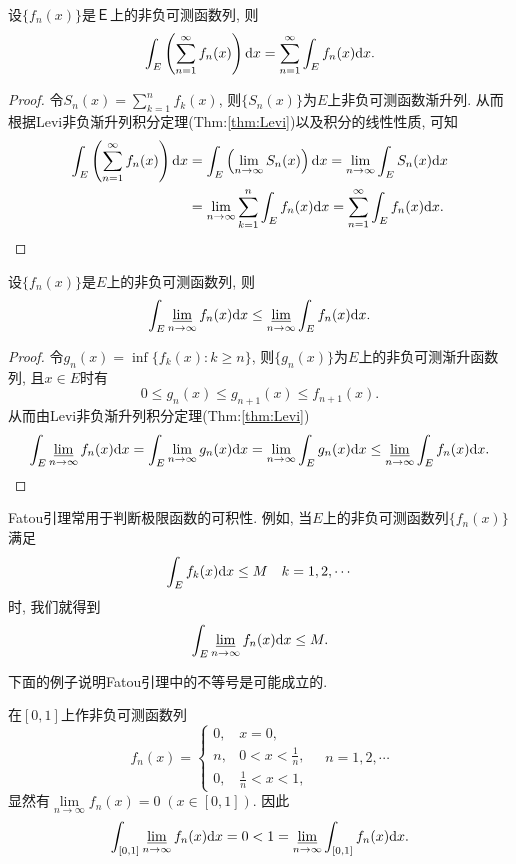 \vskip 0.2cm
\begin{theorem}[逐项积分定理]
\label{thm:Progressive Integral}
	设$\{ f_n (x) \}$是Ｅ上的非负可测函数列, 则
	\begin{equation}
		\int_E \left( \sum\limits_{n = 1}^{\infty} f_n(x) \right) \mathrm{d} x
		= \sum\limits_{n = 1}^{\infty} \int_E f_n(x) \mathrm{d} x.
	\end{equation}
\end{theorem}
\begin{proof}
	令$S_n (x) = \sum\limits_{k = 1}^{n} f_k(x)$, 
	则$\{ S_n(x) \}$为$E$上非负可测函数渐升列. 
	从而根据Levi非负渐升列积分定理(Thm:\ref{thm:Levi})以及积分的线性性质, 可知
	$$
	\begin{aligned}
		\int_E \left( \sum\limits_{n = 1}^{\infty} f_n(x) \right) \mathrm{d} x
		& = \int_E \left(\lim\limits_{n \to \infty} S_n(x)  \right) \mathrm{d} x 
		 = \lim\limits_{n \to \infty} \int_E S_n(x) \mathrm{d} x \\
		& = \lim\limits_{n \to \infty} \sum\limits_{k = 1}^{n} \int_E f_n(x) \mathrm{d} x
		 = \sum\limits_{n = 1}^{\infty} \int_E f_n(x) \mathrm{d} x.
	\end{aligned}
	$$
\end{proof}

\vskip 0.2cm
\begin{theorem}[Fatou引理]
	设$\{ f_n (x) \}$是$E$上的非负可测函数列, 则
	\begin{equation}
		\int_E \varliminf\limits_{n \to \infty} f_n(x) \mathrm{d} x \leq 
		\varliminf\limits_{n \to \infty} \int_E f_n(x) \mathrm{d} x .
	\end{equation}
\end{theorem}
\begin{proof}
	令$g_n (x) = \inf \{ f_k(x) : k \geq n \}$, 
	则$\{ g_n(x) \}$为$E$上的非负可测渐升函数列, 且$x \in E$时有
	$$
		0 \leq g_n(x) \leq g_{n+1}(x) \leq f_{n+1}(x).
	$$
	从而由Levi非负渐升列积分定理(Thm:\ref{thm:Levi})
	$$
		\int_E \varliminf\limits_{n \to \infty} f_n(x) \mathrm{d} x
		= \int_E \lim\limits_{n \to \infty} g_n(x) \mathrm{d} x
		= \lim\limits_{n \to \infty} \int_E g_n(x) \mathrm{d} x
		\leq \varliminf\limits_{n \to \infty} \int_E f_n(x) \mathrm{d} x .
	$$
\end{proof}
\vskip 0.4cm
Fatou引理常用于判断极限函数的可积性. 
例如, 当$E$上的非负可测函数列$\{ f_n (x) \}$满足
$$
	\int_E f_k(x) \mathrm{d} x \leq M \quad k=1,2,\cdots
$$
时, 我们就得到
$$
	\int_E \varliminf\limits_{n \to \infty} f_n(x) \mathrm{d} x \leq M .
$$

下面的例子说明Fatou引理中的不等号是可能成立的. 

\begin{example}
	在$[0,1]$上作非负可测函数列
	$$
	f_n(x) = 
	\begin{cases}
		0, & x=0, \\
		n, & 0 < x < \frac{1}{n}, \\
		0, & \frac{1}{n} < x <1,
	\end{cases}
	\quad n = 1,2,\cdots
	$$
	显然有$\lim\limits_{n \to \infty} f_n(x) = 0 \;(x \in [0,1]).$
	因此
	$$
		\int_{[0,1]} \varliminf\limits_{n \to \infty} f_n(x) \mathrm{d} x = 0 
		< 
		1 = \varliminf\limits_{n \to \infty} \int_{[0,1]} f_n(x) \mathrm{d} x .
	$$
\end{example}




